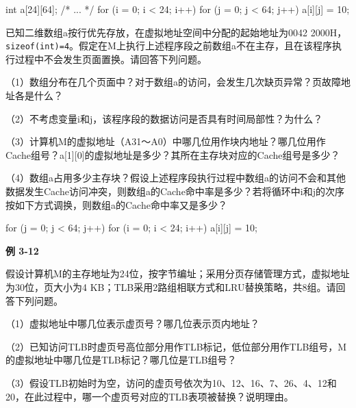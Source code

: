 \par\smallskip\noindent\begin{minipage}{\linewidth}
\begin{codeblock}[language={C}]
int a[24][64];
/* ... */
for (i = 0; i < 24; i++)
    for (j = 0; j < 64; j++) a[i][j] = 10;
\end{codeblock}
\end{minipage}\par\smallskip

已知二维数组a按行优先存放，在虚拟地址空间中分配的起始地址为0042 2000H，\texttt{sizeof(\allowbreak{}int)\allowbreak{}=\allowbreak{}4}。假定在M上执行上述程序段之前数组a不在主存，且在该程序执行过程中不会发生页面置换。请回答下列问题。

（1）数组分布在几个页面中？对于数组a的访问，会发生几次缺页异常？页故障地址各是什么？

（2）不考虑变量i和j，该程序段的数据访问是否具有时间局部性？为什么？

（3）计算机M的虚拟地址（A31～A0）中哪几位用作块内地址？哪几位用作Cache组号？a{[}1{]}{[}0{]}的虚拟地址是多少？其所在主存块对应的Cache组号是多少？

（4）数组a占用多少主存块？假设上述程序段执行过程中数组a的访问不会和其他数据发生Cache访问冲突，则数组a的Cache命中率是多少？若将循环中i和j的次序按如下方式调换，则数组a的Cache命中率又是多少？

\par\smallskip\noindent\begin{minipage}{\linewidth}
\begin{codeblock}[language={C}]
for (j = 0; j < 64; j++)
    for (i = 0; i < 24; i++) a[i][j] = 10;
\end{codeblock}
\end{minipage}\par\smallskip

\par\medskip{}\noindent\hypertarget{CO03-E12}{}\label{CO03-E12}\textbf{例 3-12}\par\nobreak\smallskip

假设计算机M的主存地址为24位，按字节编址；采用分页存储管理方式，虚拟地址为30位，页大小为4 KB；TLB采用2路组相联方式和LRU替换策略，共8组。请回答下列问题。

（1）虚拟地址中哪几位表示虚页号？哪几位表示页内地址？

（2）已知访问TLB时虚页号高位部分用作TLB标记，低位部分用作TLB组号，M的虚拟地址中哪几位是TLB标记？哪几位是TLB组号？

（3）假设TLB初始时为空，访问的虚页号依次为10、12、16、7、26、4、12和20，在此过程中，哪一个虚页号对应的TLB表项被替换？说明理由。

